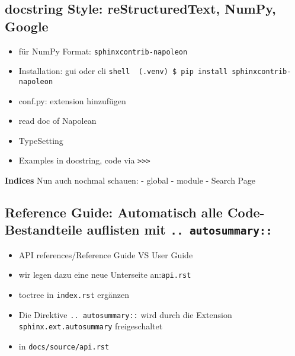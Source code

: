 \hypertarget{docstring-style-restructuredtext-numpy-google}{%
\subsection{\texorpdfstring{\textbf{docstring Style:} reStructuredText,
NumPy,
Google}{docstring Style: reStructuredText, NumPy, Google}}\label{docstring-style-restructuredtext-numpy-google}}

\begin{itemize}
\tightlist
\item
  für NumPy Format: \texttt{sphinxcontrib-napoleon}
\item
  Installation: gui oder cli
  \texttt{shell\ \ (.venv)\ \$\ pip\ install\ sphinxcontrib-napoleon}
\item
  conf.py: extension hinzufügen
\item
  read doc of Napolean
\item
  TypeSetting
\item
  Examples in docstring, code via
  \texttt{\textgreater{}\textgreater{}\textgreater{}}
\end{itemize}

\textbf{Indices} Nun auch nochmal schauen: - global - module - Search
Page

\hypertarget{reference-guide-automatisch-alle-code-bestandteile-auflisten-mit-..-autosummary}{%
\subsection{\texorpdfstring{Reference Guide: Automatisch alle
Code-Bestandteile auflisten mit
\texttt{..\ autosummary::}}{Reference Guide: Automatisch alle Code-Bestandteile auflisten mit .. autosummary::}}\label{reference-guide-automatisch-alle-code-bestandteile-auflisten-mit-..-autosummary}}

\begin{itemize}
\item
  API references/Reference Guide VS User Guide
\item
  wir legen dazu eine neue Unterseite an:\texttt{api.rst}
\item
  toctree in \texttt{index.rst} ergänzen
\item
  Die Direktive \texttt{..\ autosummary::} wird durch die Extension
  \texttt{sphinx.ext.autosummary} freigeschaltet
\item
  in \texttt{docs/source/api.rst}

\begin{Shaded}
\begin{Highlighting}[]

\end{Highlighting}
\end{Shaded}
\end{itemize}

